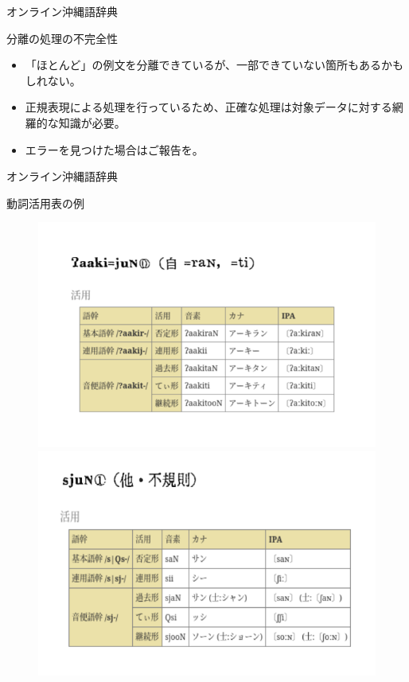 \documentclass[14pt]{beamer}
\begin{document}
\begin{frame}{オンライン沖縄語辞典}
  \begin{block}{分離の処理の不完全性}
    \begin{itemize}
    \item 「ほとんど」の例文を分離できているが、一部できていない箇所もあるかもしれない。
    \item 正規表現による処理を行っているため、正確な処理は対象データに対する網羅的な知識が必要。
    \item エラーを見つけた場合はご報告を。
    \end{itemize}
  \end{block}
\end{frame}

\begin{frame}{オンライン沖縄語辞典}
  \begin{block}{動詞活用表の例}
    \begin{figure}[ht]
      \centering
      \begin{minipage}{0.4\paperwidth}
        \includegraphics[height=0.36\paperheight]{verb-conugation-comparison.png}
      \end{minipage}%
      \begin{minipage}{0.4\textwidth}
        \includegraphics[height=0.34\paperheight]{verb-conjugation-comparison-2.png}
      \end{minipage}
    \end{figure}
  \end{block}
\end{frame}
\end{document}
